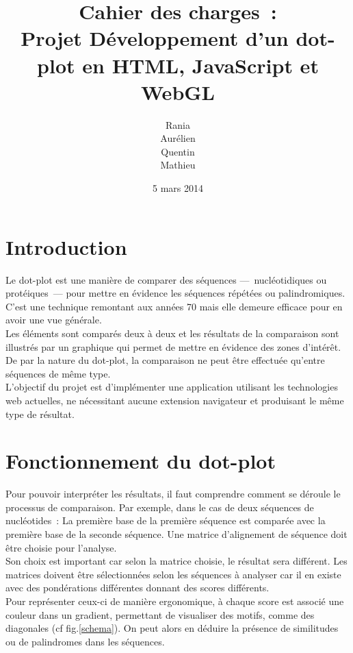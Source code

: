 \documentclass{report}
\title{Cahier des charges~: \\Projet Développement d'un dot-plot en HTML, JavaScript et WebGL }
\author{Rania \bsc{Assab} \\ Aurélien \bsc{Luciani}\\ Quentin \bsc{Riché-Piotaix}\\ Mathieu \bsc{Schaeffer}}
\date{5 mars 2014}
\begin{document}
\maketitle

\tableofcontents
{}
\chapter*{Introduction}

Le dot-plot est une manière de comparer des séquences ---~nucléotidiques ou protéiques~--- pour mettre en évidence les séquences répétées ou palindromiques. C'est une technique remontant aux années 70 mais elle demeure efficace pour en avoir une vue générale.\\
Les éléments sont comparés deux à deux et les résultats de la comparaison sont illustrés par un graphique qui permet de mettre en évidence des zones d'intérêt.\\
De par la nature du dot-plot, la comparaison ne peut être effectuée qu'entre séquences de même type.\\
L'objectif du projet est d'implémenter une application utilisant les technologies web actuelles, ne nécessitant aucune extension navigateur et produisant le même type de résultat.

\chapter{Fonctionnement du dot-plot}

Pour pouvoir interpréter les résultats, il faut comprendre comment se déroule le processus de comparaison. Par exemple, dans le cas de deux séquences de nucléotides~: La première base de la première séquence est comparée avec la première base de la seconde séquence. Une matrice d'alignement de séquence doit être choisie pour l'analyse.\\
Son choix est important car selon la matrice choisie, le résultat sera différent. Les matrices doivent être sélectionnées selon les séquences à analyser car il en existe avec des pondérations différentes donnant des scores différents.\\
Pour représenter ceux-ci de manière ergonomique, à chaque score est associé une couleur dans un gradient, permettant de visualiser des motifs, comme des diagonales (cf fig.\ref{schema}). On peut alors en déduire la présence de similitudes ou de palindromes dans les séquences.\\
\end{document}
